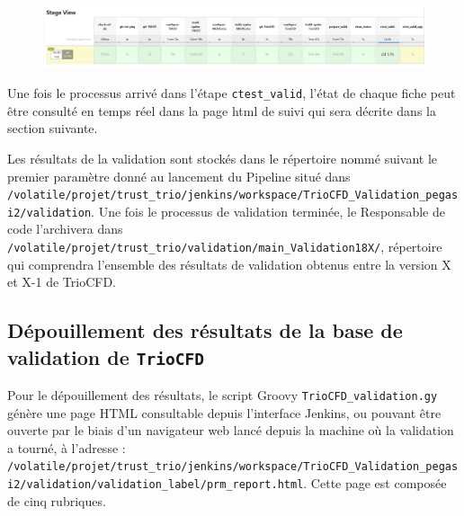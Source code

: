 \begin{figure}[H]
   \centering
   \includegraphics[width=16cm]{pictures/etapes_validation.png}
   \vspace*{0.2cm}
\end{figure}

Une fois le processus arrivé dans l'étape \texttt{ctest\_valid}, l'état de chaque fiche peut être consulté en temps réel dans la page html de suivi qui sera décrite dans la section suivante.

Les résultats de la validation sont stockés dans le répertoire nommé suivant le premier paramètre donné au lancement du Pipeline situé dans \texttt{/volatile/projet/trust\_trio/jenkins/workspace/TrioCFD\_Validation\_pegasi2/validation}. Une fois le processus de validation terminée, le Responsable de code l'archivera dans \texttt{/volatile/projet/trust\_trio/validation/main\_Validation18X/}, répertoire qui comprendra l'ensemble des résultats de validation obtenus entre la version X et X-1 de TrioCFD.


\subsection{Dépouillement des résultats de la base de validation de \texttt{TrioCFD}}

Pour le dépouillement des résultats, le script Groovy \texttt{TrioCFD\_validation.gy} génère une page HTML consultable  depuis l'interface Jenkins, ou pouvant être ouverte par le biais d'un navigateur web lancé depuis la machine où la validation a tourné, à l'adresse : \texttt{/volatile/projet/trust\_trio/jenkins/workspace/TrioCFD\_Validation\_pegasi2/validation/valida\-tion\_label/prm\_report.html}. Cette page est composée de cinq rubriques.\smallskip\\


